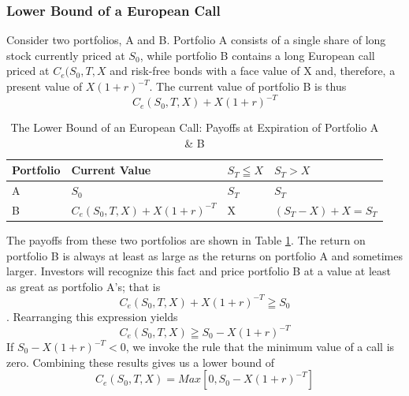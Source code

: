 \documentclass{book}
\theoremstyle{definition}
\theoremstyle{remark}
\begin{document}
        \subsubsection{Lower Bound of a European Call}
        
            Consider two portfolios, A and B. Portfolio A consists of  a single share of long stock currently priced at $S_0$, while portfolio B contains a long European call priced at $C_e(S_0,T, X$ and risk-free bonds with a face value of X and, therefore, a present value of $X(1+r)^{-T}$. The current value of portfolio B is thus $$ C_e(S_0, T, X) + X(1+r)^{-T} $$

                \begin{table}[h]
                    \centering
                    \caption{The Lower Bound of an European Call: Payoffs at Expiration of Portfolio A \& B}
                    \label{tab:EcallLB}
                        \begin{center} 
                        \begin{tabular}[h]{llll}
                        \toprule    
                            Portfolio & Current Value & $S_T \leqq X$ & $S_T > X$ \\
                        \midrule    
                            A & $S_0$ & $S_T$ & $S_T$ \\
                            B & $C_e(S_0, T, X) + X(1+r)^{-T}$ & X & $(S_T - X) + X = S_T$ \\
                        \bottomrule
                        \end{tabular} 
                        \end{center}
                \end{table}            
            
            The payoffs from these two portfolios are shown in Table \ref{tab:EcallLB}. The return on portfolio B is always at least as large as the returns on portfolio A and sometimes larger. Investors will recognize this fact and price portfolio B at a value at least as great as portfolio A's; that is $$ C_e(S_0, T, X) + X(1+r)^{-T} \geqq S_0 $$. Rearranging this expression yields $$ C_e(S_0, T, X) \geqq S_0 - X(1+r)^{-T} $$
            If $ S_0 - X(1+r)^{-T} < 0$, we invoke the rule that the minimum value of a call is zero. Combining these results gives us a lower bound of
                \begin{equation}
                     C_e(S_0, T, X) = Max \left[ 0, S_0 - X(1+r)^{-T} \right]
                \end{equation}
\end{document}

